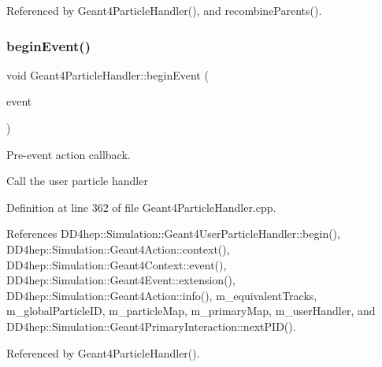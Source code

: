 Referenced by Geant4\+Particle\+Handler(), and recombine\+Parents().

\hypertarget{class_d_d4hep_1_1_simulation_1_1_geant4_particle_handler_adfcc944cca3597fac178ccebbc405a1f}{}\label{class_d_d4hep_1_1_simulation_1_1_geant4_particle_handler_adfcc944cca3597fac178ccebbc405a1f} 
\subsubsection{\texorpdfstring{begin\+Event()}{beginEvent()}}
{\footnotesize\ttfamily void Geant4\+Particle\+Handler\+::begin\+Event (\begin{DoxyParamCaption}\item[{const G4\+Event $\ast$}]{event }\end{DoxyParamCaption})\hspace{0.3cm}{\ttfamily [virtual]}}



Pre-\/event action callback. 

Call the user particle handler 

Definition at line 362 of file Geant4\+Particle\+Handler.\+cpp.



References D\+D4hep\+::\+Simulation\+::\+Geant4\+User\+Particle\+Handler\+::begin(), D\+D4hep\+::\+Simulation\+::\+Geant4\+Action\+::context(), D\+D4hep\+::\+Simulation\+::\+Geant4\+Context\+::event(), D\+D4hep\+::\+Simulation\+::\+Geant4\+Event\+::extension(), D\+D4hep\+::\+Simulation\+::\+Geant4\+Action\+::info(), m\+\_\+equivalent\+Tracks, m\+\_\+global\+Particle\+ID, m\+\_\+particle\+Map, m\+\_\+primary\+Map, m\+\_\+user\+Handler, and D\+D4hep\+::\+Simulation\+::\+Geant4\+Primary\+Interaction\+::next\+P\+I\+D().



Referenced by Geant4\+Particle\+Handler().

\hypertarget{class_d_d4hep_1_1_simulation_1_1_geant4_particle_handler_a9eaea81103cfd2b7ede33538ea1391f4}{}\label{class_d_d4hep_1_1_simulation_1_1_geant4_particle_handler_a9eaea81103cfd2b7ede33538ea1391f4} 
